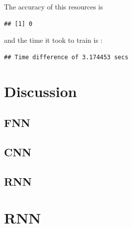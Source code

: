 \documentclass[letter]{article}\usepackage[]{graphicx}\usepackage[]{color}
\makeatletter
\newenvironment{kframe}{%
 \def\at@end@of@kframe{}%
 \ifinner\ifhmode%
  \def\at@end@of@kframe{\end{minipage}}%
  \begin{minipage}{\columnwidth}%
 \fi\fi%
 \def\FrameCommand##1{\hskip\@totalleftmargin \hskip-\fboxsep
 \colorbox{shadecolor}{##1}\hskip-\fboxsep
     \hskip-\linewidth \hskip-\@totalleftmargin \hskip\columnwidth}%
 \MakeFramed {\advance\hsize-\width
   \@totalleftmargin\z@ \linewidth\hsize
   \@setminipage}}%
 {\par\unskip\endMakeFramed%
 \at@end@of@kframe}
\newenvironment{knitrout}{}{} %
\makeatother
\begin{document}
The accuracy of this resources is
\begin{knitrout}
\color{fgcolor}\begin{kframe}
\begin{verbatim}
## [1] 0
\end{verbatim}
\end{kframe}
\end{knitrout}
and the time it took to train is :
\begin{knitrout}
\color{fgcolor}\begin{kframe}
\begin{verbatim}
## Time difference of 3.174453 secs
\end{verbatim}
\end{kframe}
\end{knitrout}


\section{Discussion}
\subsection{FNN}
\subsection{CNN}
\subsection{RNN}
\section{RNN}

\newpage
\pagestyle{plain}

\end{document}
